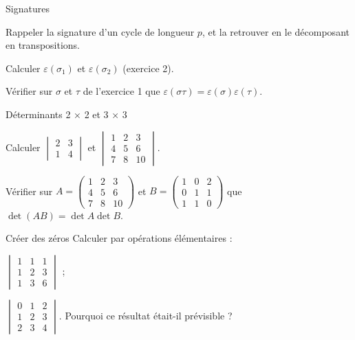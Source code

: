 \begin{exercice}[1]{Signatures}
\begin{questions}
  \item Rappeler la signature d'un cycle de longueur $p$, et la retrouver
    en le décomposant en transpositions.
  \item Calculer $\varepsilon(\sigma_1)$ et $\varepsilon(\sigma_2)$
    (exercice 2).
  \item Vérifier sur $\sigma$ et $\tau$ de l'exercice 1 que
    $\varepsilon(\sigma\tau)=\varepsilon(\sigma)\varepsilon(\tau)$.
\end{questions}
\end{exercice}

\begin{exercice}[1]{Déterminants 2 × 2 et 3 × 3}
\begin{questions}
  \item Calculer $\begin{vmatrix}2&3\\1&4\end{vmatrix}$ et
    $\begin{vmatrix}1&2&3\\4&5&6\\7&8&10\end{vmatrix}$.
  \item Vérifier sur $A=\begin{pmatrix}1&2&3\\4&5&6\\7&8&10\end{pmatrix}$
    et $B=\begin{pmatrix}1&0&2\\0&1&1\\1&1&0\end{pmatrix}$ que
    $\det(AB)=\det A\det B$.
\end{questions}
\end{exercice}

\begin{exercice}[1]{Créer des zéros}
Calculer par opérations élémentaires :
\begin{questions}
  \item $\begin{vmatrix}1&1&1\\1&2&3\\1&3&6\end{vmatrix}$ ;
  \item $\begin{vmatrix}0&1&2\\1&2&3\\2&3&4\end{vmatrix}$. Pourquoi ce
    résultat était-il prévisible ?
\end{questions}
\end{exercice}

